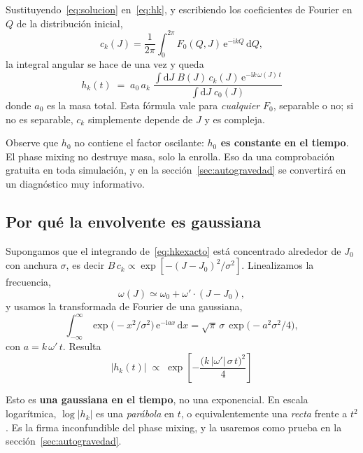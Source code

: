 \documentclass[11pt,a4paper]{article}
\newcommand{\dd}{\mathrm{d}}
\newcommand{\ee}{\mathrm{e}}
\newcommand{\ii}{\mathrm{i}}
\newcommand{\Jr}{J}
\newcommand{\Qr}{Q}
\theoremstyle{definition}
\begin{document}
Sustituyendo~\eqref{eq:solucion} en~\eqref{eq:hk}, y escribiendo los coeficientes
de Fourier en $\Qr$ de la distribución inicial,
\begin{equation}
  c_k(\Jr) = \frac{1}{2\pi}\int_0^{2\pi} F_0(\Qr,\Jr)\,\ee^{-\ii k\Qr}\,\dd \Qr ,
\end{equation}
la integral angular se hace de una vez y queda
\begin{equation}
  \boxed{\;
  h_k(t) \;=\; a_0\,a_k\;
  \frac{\displaystyle\int \dd \Jr\; B(\Jr)\,c_k(\Jr)\,\ee^{-\ii k\,\omega(\Jr)\,t}}
       {\displaystyle\int \dd \Jr\; c_0(\Jr)} \;}
  \label{eq:hkexacto}
\end{equation}
donde $a_0$ es la masa total. Esta fórmula vale para \emph{cualquier} $F_0$,
separable o no; si no es separable, $c_k$ simplemente depende de $\Jr$ y es
compleja.

Observe que $h_0$ no contiene el factor oscilante: \textbf{$h_0$ es constante en el
tiempo}. El phase mixing no destruye masa, solo la enrolla. Eso da una
comprobación gratuita en toda simulación, y en la sección~\ref{sec:autogravedad}
se convertirá en un diagnóstico muy informativo.

\subsection{Por qué la envolvente es gaussiana}
\label{sec:envolvente}

Supongamos que el integrando de~\eqref{eq:hkexacto} está concentrado alrededor de
$\Jr_0$ con anchura $\sigma$, es decir $B\,c_k \propto
\exp[-(\Jr-\Jr_0)^2/\sigma^2]$. Linealizamos la frecuencia,
\begin{equation}
  \omega(\Jr) \simeq \omega_0 + \omega'\cdot(\Jr-\Jr_0),
\end{equation}
y usamos la transformada de Fourier de una gaussiana,
\begin{equation}
  \int_{-\infty}^{\infty} \exp\!\big(-x^2/\sigma^2\big)\,\ee^{-\ii a x}\,\dd x
  = \sqrt{\pi}\,\sigma\,\exp\!\big(-a^2\sigma^2/4\big),
\end{equation}
con $a=k\,\omega'\,t$. Resulta
\begin{equation}
  \boxed{\;|h_k(t)| \;\propto\; \exp\!\left[-\frac{\big(k\,|\omega'|\,\sigma\,t\big)^2}{4}\right]\;}
  \label{eq:gaussiana}
\end{equation}

Esto es \textbf{una gaussiana en el tiempo}, no una exponencial. En escala
logarítmica, $\log|h_k|$ es una \emph{parábola} en $t$, o equivalentemente una
\emph{recta} frente a $t^2$. Es la firma inconfundible del phase mixing, y la
usaremos como prueba en la sección~\ref{sec:autogravedad}.
\end{document}

